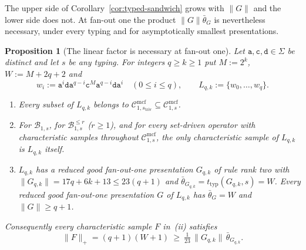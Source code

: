 \documentclass[11pt]{article}
\numberwithin{equation}{section}
\theoremstyle{plain}
\newtheorem{proposition}[theorem]{Proposition}
\theoremstyle{definition}
\theoremstyle{remark}
\newcommand{\Cmcf}[2]{\mathcal{C}^{\mathrm{mcf}}_{#1,#2}}
\begin{document}
The upper side of Corollary~\ref{cor:typed-sandwich} grows with $\|G\|$ and
the lower side does not.  At fan-out one the product $\|G\|\bar\theta_G$ is
nevertheless necessary, under every typing and for asymptotically smallest
presentations.

\begin{proposition}[The linear factor is necessary at fan-out one]
\label{prop:linear-factor-sharp}
Let $\mathtt a,\mathtt c,\mathtt d\in\Sigma$ be distinct and let $s$ be any
typing.  For integers $q\ge k\ge1$ put $M:=2^k$, $W:=M+2q+2$ and
\[
 w_i:=\mathtt a^i\mathtt d\mathtt a^{q-i}\mathtt c^M\mathtt a^{q-i}\mathtt d
 \mathtt a^i\quad(0\le i\le q),\qquad L_{q,k}:=\{w_0,\ldots,w_q\}.
\]
\begin{enumerate}[label=\textup{(\roman*)},leftmargin=*]
\item Every subset of $L_{q,k}$ belongs to
$\Cmcf{1}{s_{\mathrm{triv}}}\subseteq\Cmcf{1}{s}$.
\item For $\mathcal B_{1,s}$, for $\mathcal B^{\le r}_{1,s}$ \textup($r\ge1$\textup),
and for every set-driven operator with characteristic samples throughout
$\Cmcf{1}{s}$, the only characteristic sample of $L_{q,k}$ is $L_{q,k}$ itself.
\item $L_{q,k}$ has a reduced good fan-out-one presentation $G_{q,k}$ of rule
rank two with $\|G_{q,k}\|=17q+6k+13\le23(q+1)$ and
$\bar\theta_{G_{q,k}}=t_{\mathrm{typ}}(G_{q,k},s)=W$.  Every reduced good
fan-out-one presentation $G$ of $L_{q,k}$ has $\bar\theta_G=W$ and
$\|G\|\ge q+1$.
\end{enumerate}
Consequently every characteristic sample $F$ in~\textup{(ii)} satisfies
\[
 \|F\|_+=(q+1)(W+1)\ \ge\ \tfrac1{23}\,\|G_{q,k}\|\,\bar\theta_{G_{q,k}}.
\]
\end{proposition}
\end{document}
